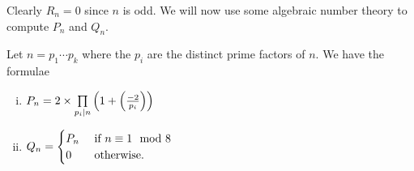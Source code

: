 \documentclass[12pt, a4paper]{report}
\begin{document}
Clearly $R_n = 0$ since $n$ is odd. We will now use some algebraic number theory
to compute $P_n$ and $Q_n$.

\begin{thm} \label{coeff_formula}
  Let $n = p_1 \cdots p_k$ where the $p_i$ are the distinct prime factors of
  $n$. We have the formulae
  \begin{enumerate}[(i)]
  \item \(P_n = 2 \times \prod\limits_{p_i \mid n} \left( 1+ \left(\frac{-2}{p_i}\right)
      \right)\)

  \item \( Q_n =
      \begin{cases}
        P_n &\text{ if } n \equiv 1 \mod{8} \\
        0 &\textnormal{ otherwise.}
      \end{cases}
    \)
  \end{enumerate}
\end{thm}
\end{document}
